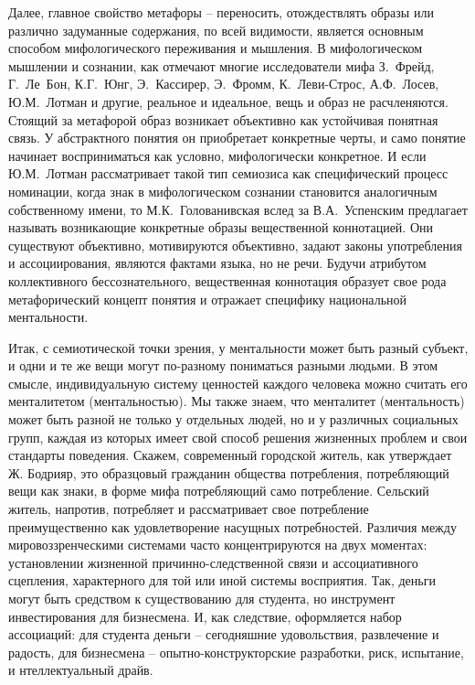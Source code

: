 Далее, главное свойство метафоры -- переносить, отождествлять образы или различно
задуманные содержания, по всей видимости, является основным способом мифологического
переживания и мышления. В мифологическом мышлении и сознании, как отмечают многие
исследователи мифа З.~Фрейд, Г.~Ле~Бон, К.Г.~Юнг, Э.~Кассирер, Э.~Фромм, К.~Леви-Строс,
А.Ф.~Лосев, Ю.М.~Лотман и другие, реальное и идеальное, вещь и образ не расчленяются.
Стоящий за метафорой образ возникает объективно как устойчивая понятная связь. У абстрактного
понятия он приобретает конкретные черты, и само понятие начинает восприниматься как условно,
мифологически конкретное. И если Ю.М.~Лотман рассматривает такой тип семиозиса как специфический
процесс номинации, когда знак в мифологическом сознании становится аналогичным собственному имени\autocite{name_culture},
то М.К.~Голованивская вслед за В.А.~Успенским предлагает называть возникающие конкретные образы
вещественной коннотацией.\autocite{uspensky} Они существуют объективно, мотивируются объективно,
задают законы употребления и ассоциирования, являются фактами языка, но не речи. Будучи атрибутом
коллективного бессознательного, вещественная коннотация образует свое рода метафорический концепт
понятия и отражает специфику национальной ментальности.

Итак, с семиотической точки зрения, у ментальности может быть разный субъект,
и одни и те же вещи могут по-разному пониматься разными людьми. В этом смысле, индивидуальную
систему ценностей каждого человека можно считать его менталитетом (ментальностью). Мы также знаем,
что менталитет (ментальность) может быть разной не только у отдельных людей, но и у различных
социальных групп, каждая из которых имеет свой способ решения жизненных проблем и свои стандарты поведения.
Скажем, современный городской житель, как утверждает Ж. Бодрияр, это образцовый гражданин общества
потребления, потребляющий вещи как знаки, в форме мифа потребляющий само потребление.\autocite{bodriyar_society}
Сельский житель, напротив, потребляет и рассматривает свое потребление преимущественно как удовлетворение
насущных потребностей. Различия между мировоззренческими системами часто концентрируются на двух моментах:
установлении жизненной причинно-следственной связи и ассоциативного сцепления, характерного для той или
иной системы восприятия. Так, деньги могут быть средством к существованию для студента, но инструмент инвестирования
для бизнесмена. И, как следствие, оформляется набор ассоциаций: для студента деньги -- сегодняшние удовольствия,
развлечение и радость, для бизнесмена -- опытно-конструкторские разработки, риск, испытание, и
нтеллектуальный драйв.

